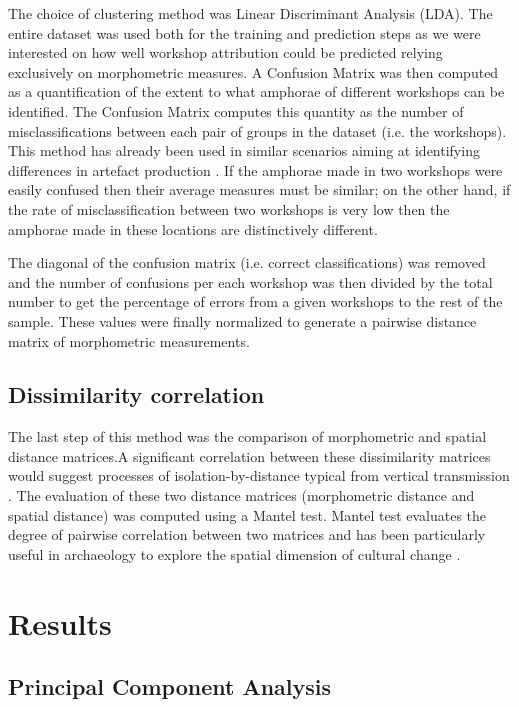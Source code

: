 \documentclass[review]{elsarticle}
\begin{document}
The choice of clustering method was Linear Discriminant Analysis (LDA). The entire dataset was used both for the training and prediction steps as we were interested on how well workshop attribution could be predicted relying exclusively on morphometric measures. A Confusion Matrix was then computed as a quantification of the extent to what amphorae of different workshops can be identified. The Confusion Matrix computes this quantity as the number of misclassifications between each pair of groups in the dataset (i.e. the workshops). This method has already been used in similar scenarios aiming at identifying differences in artefact production \citep{charlton_investigating_2012, thorpe_distribution_1984,i_martin_alisis_1998}. If the amphorae made in two workshops were easily confused then their average measures must be similar; on the other hand, if the rate of misclassification between two workshops is very low then the amphorae made in these locations are distinctively different.

The diagonal of the confusion matrix (i.e. correct classifications) was removed and the number of confusions per each workshop was then divided by the total number to get the percentage of errors from a given workshops to the rest of the sample. These values were finally normalized to generate a pairwise distance matrix of morphometric measurements.

\subsection{Dissimilarity correlation}

The last step of this method was the comparison of morphometric and spatial distance matrices.A significant correlation between these dissimilarity matrices would suggest processes of isolation-by-distance typical from vertical transmission \citep{crema_culture_2014}. The evaluation of these two distance matrices (morphometric distance and spatial distance) was computed using a Mantel test. Mantel test evaluates the degree of pairwise correlation between two matrices and has been particularly useful in archaeology to explore the spatial dimension of cultural change \citep{mantel_detection_1967, diniz-filho_mantel_2013, crema_culture_2014}.  

\section{Results}

\subsection{Principal Component Analysis}
\end{document}
